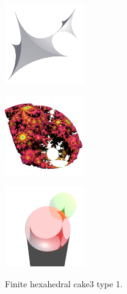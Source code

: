 \documentclass[suppldata, dvipdfmx]{interact}
\theoremstyle{plain}%
\theoremstyle{definition}
\theoremstyle{remark}
\theoremstyle{problemstyle}
\begin{document}
\begin{figure}[H]
 \begin{minipage}{0.5\textwidth}
  \begin{minipage}[t]{0.24\textwidth}
   \centering \includegraphics[width=1.35in, height=1.35in,
   keepaspectratio]{./img/sphairahedron/hexahedralCake3/sphairahedronFinite_a.jpg}
   \label{fig:cake3finiteSphairahedronType1}
  \end{minipage}
  \hspace*{\fill}
  \begin{minipage}[t]{0.24\textwidth}
   \centering
   \includegraphics[width=1.35in, height=1.35in,
   keepaspectratio]{./img/sphairahedron/hexahedralCake3/limitsetFinite_a.jpg}
   \label{fig:cake3finiteLimitsetType1}
  \end{minipage}
  \hspace*{\fill}
  \caption{Finite hexahedral cake3 type 1.}
  \label{fig:cake3finiteType1}
 \end{minipage}
 \hspace*{\fill}
 \begin{minipage}{0.5\textwidth}
  \begin{minipage}[t]{0.24\textwidth}
   \centering
   \includegraphics[width=1.35in, height=1.35in,
   keepaspectratio]{./img/sphairahedron/hexahedralCake3/sphairahedralPrismInf_a.jpg}
   \label{fig:cake3infiniteSphairahedronType1}

\end{minipage}
\end{minipage}
\end{figure}
\end{document}

